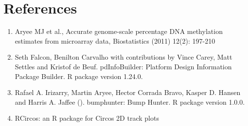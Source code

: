 \documentclass[11pt]{article}
\begin{document}
\section*{References}  
\begin{enumerate}


	\item  Aryee MJ et al., Accurate genome-scale percentage DNA methylation estimates
	  from microarray data, Biostatistics (2011) 12(2): 197-210 	

	\item  Seth Falcon, Benilton Carvalho with contributions by Vince Carey, Matt
	  Settles and Kristof de Beuf. pdInfoBuilder: Platform Design Information
	  Package Builder. R package version 1.24.0.
	
	\item   Rafael A. Irizarry, Martin Aryee, Hector Corrada Bravo, Kasper D. Hansen and	Harris A. Jaffee (). bumphunter: Bump Hunter. R package version 1.0.0.
		
	\item RCircos: an R package for Circos 2D track plots

\end{enumerate}

 
 
 
 
 
\end{document}
